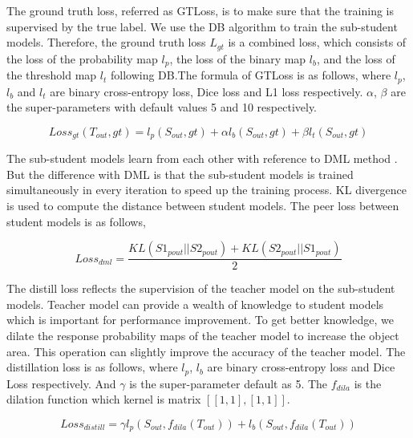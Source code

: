 \documentclass[letterpaper]{article} %
\begin{document}
The ground truth loss, referred as GTLoss, is to make sure that the training is supervised by the true label. We use the DB algorithm \cite{DB} to train the sub-student models. Therefore, the ground truth loss $L_{gt}$ is a combined loss, which consists of the loss of the probability map $l_{p}$, the loss of the binary map $l_{b}$, and the loss of the threshold map $l_{t}$ following DB.The formula of GTLoss is as follows, where $l_{p}$, $l_{b}$ and $l_{t}$ are binary cross-entropy loss, Dice loss  and L1 loss respectively. $\alpha $, $\beta$ are the super-parameters with default values 5 and 10 respectively.  
\begin{small}
\begin{equation}
Loss_{gt}(T_{out}, gt) = l_{p}(S_{out}, gt) + \alpha l_{b}(S_{out}, gt) + \beta l_{t}(S_{out}, gt)
\end{equation}
\label{loss_dml}
\end{small}

The sub-student models learn from each other with reference to DML method \cite{dml2017}. But the difference with DML is that the sub-student models is trained simultaneously in every iteration to speed up the training process. KL divergence is used to compute the distance between student models. The peer loss between student models is as follows, 
\begin{small}
\begin{equation}
Loss_{dml} = \frac{KL(S1_{pout} || S2_{pout}) + KL(S2_{pout} || S1_{pout})}{2}
\end{equation}
\label{loss_dml}
\end{small}

The distill loss reflects the supervision of the teacher model on the sub-student models. Teacher model can provide a wealth of knowledge to student models which is important for performance improvement.
To get better knowledge, we dilate the response probability maps of the teacher model to increase the object area. This operation can slightly improve the accuracy of the teacher model. The distillation loss is as follows, where $l_{p}$, $l_{b}$  are binary cross-entropy loss and Dice Loss respectively. And $ \gamma $ is the super-parameter default as 5. The $f_{dila}$ is the dilation function which kernel is matrix $[[1,1],[1,1]]$.
\begin{small}
\begin{equation}
Loss_{distill} = \gamma l_{p}(S_{out}, f_{dila}(T_{out})) + l_{b}(S_{out}, f_{dila}(T_{out}))
\end{equation}
\label{loss_dml}
\end{small}
\end{document}
